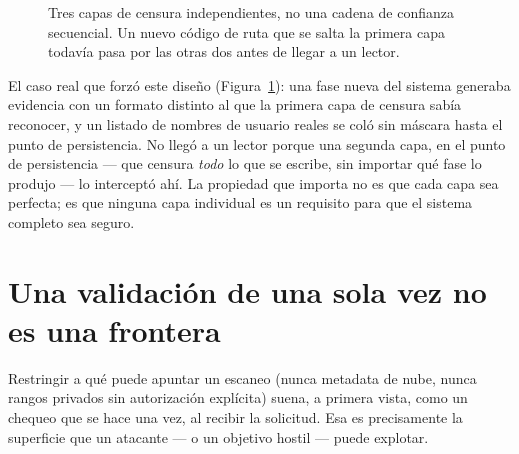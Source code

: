 \documentclass[10pt]{article}
\begin{document}
\begin{figure}[h]
\centering
{}
\caption{Tres capas de censura independientes, no una cadena de confianza secuencial. Un nuevo código de ruta que se salta la primera capa todavía pasa por las otras dos antes de llegar a un lector.}
\label{fig:redact}
\end{figure}

El caso real que forzó este diseño (Figura~\ref{fig:redact}): una fase nueva del sistema generaba evidencia con un formato distinto al que la primera capa de censura sabía reconocer, y un listado de nombres de usuario reales se coló sin máscara hasta el punto de persistencia. No llegó a un lector porque una segunda capa, en el punto de persistencia --- que censura \emph{todo} lo que se escribe, sin importar qué fase lo produjo --- lo interceptó ahí. La propiedad que importa no es que cada capa sea perfecta; es que ninguna capa individual es un requisito para que el sistema completo sea seguro.

\section{Una validación de una sola vez no es una frontera}

Restringir a qué puede apuntar un escaneo (nunca metadata de nube, nunca rangos privados sin autorización explícita) suena, a primera vista, como un chequeo que se hace una vez, al recibir la solicitud. Esa es precisamente la superficie que un atacante --- o un objetivo hostil --- puede explotar.
\end{document}
